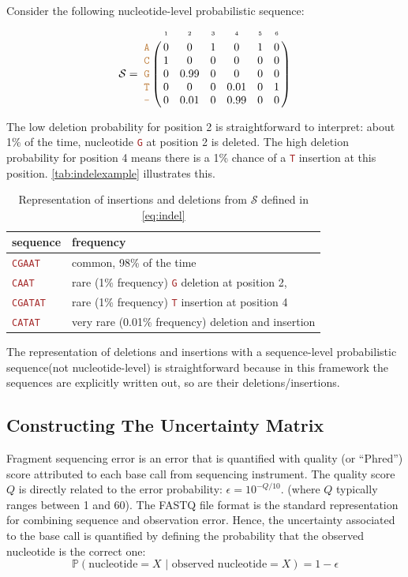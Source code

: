 \documentclass[
]{article}
\newcommand{\sq}[1]{\texttt{\textcolor{brown}{#1}}}
\newcommand{\nps}{\mathcal{S}} %
\newcommand{\nlps}{nucleotide-level probabilistic sequence\xspace}
\newcommand{\slps}{sequence-level probabilistic sequence\xspace}
\newcommand{\pr}[1]{\mathbb{P}(#1)}
\begin{document}
Consider the following \nlps: \begin{equation}
\label{eq:indel}
\nps = 
\bordermatrix{
&\scriptscriptstyle{1} & \scriptscriptstyle{2}& \scriptscriptstyle{3}& \scriptscriptstyle{4} & \scriptscriptstyle{5} & \scriptscriptstyle{6} \cr
\sq{A} & 0 & 0   & 1 & 0    & 1 & 0\cr
\sq{C} & 1 & 0    & 0 & 0    & 0 & 0\cr
\sq{G} & 0 & 0.99 & 0 & 0    & 0 & 0\cr
\sq{T} & 0 & 0    & 0 & 0.01 & 0 & 1\cr
\sq{-} & 0 & 0.01 & 0 & 0.99 & 0 & 0\cr
}
\end{equation}

The low deletion probability for position 2 is straightforward to
interpret: about 1\% of the time, nucleotide \sq{G} at position 2 is
deleted. The high deletion probability for position 4 means there is a
1\% chance of a \sq{T} insertion at this position.
\autoref{tab:indelexample} illustrates this.

\begin{table}[H]
\caption{Representation of insertions and deletions from $\nps$ defined in \eqref{eq:indel}}
\begin{center}
\label{tab:indelexample}
\begin{tabular}{ll}
\hline
\textbf{sequence} & \textbf{frequency} \\
\hline
\sq{CGAAT}  & common, 98\% of the time \\
\sq{CAAT}   & rare (1\% frequency) \sq{G} deletion at position 2,  \\
\sq{CGATAT} & rare (1\% frequency) \sq{T} insertion at position 4 \\
\sq{CATAT} & very rare (0.01\% frequency) deletion and insertion  \\
\hline
\end{tabular}
\end{center}
\end{table}

The representation of deletions and insertions with a \slps (not
nucleotide-level) is straightforward because in this framework the
sequences are explicitly written out, so are their deletions/insertions.

\hypertarget{constructing-the-uncertainty-matrix}{%
\subsection{Constructing The Uncertainty
Matrix}\label{constructing-the-uncertainty-matrix}}

Fragment sequencing error is an error that is quantified with quality
(or ``Phred'') score attributed to each base call from sequencing
instrument. The quality score \(Q\) is directly related to the error
probability: \(\epsilon = 10^{-Q/10}\).
\cite{ewingBaseCallingAutomatedSequencer1998} (where \(Q\) typically
ranges between 1 and 60). The FASTQ file format is the standard
representation for combining sequence and observation error. Hence, the
uncertainty associated to the base call is quantified by defining the
probability that the observed nucleotide is the correct one:
\begin{equation}
\label{eq:basecall}
\pr{\text{nucleotide}=X \,\,|\,\, \text{observed nucleotide} = X} = 1 - \epsilon
\end{equation}
\end{document}
